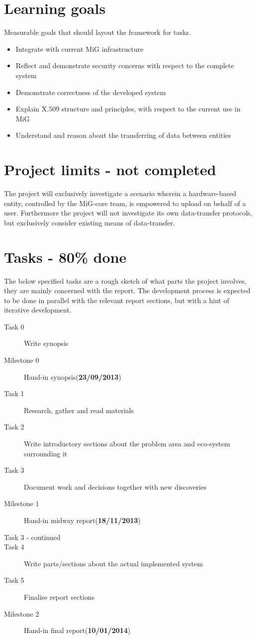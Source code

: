 \documentclass[paper=a4, fontsize=11pt]{scrartcl} %
\numberwithin{equation}{section} %
\numberwithin{figure}{section} %
\numberwithin{table}{section} %
\begin{document}
\section{Learning goals}
Measurable goals that should layout the framework for tasks.

\begin{itemize}
\item Integrate with current MiG infrastructure
\item Reflect and demonstrate security concerns with respect to the complete
    system
\item Demonstrate correctness of the developed system
\item Explain X.509 structure and principles, with respect to the current
    use in MiG
\item Understand and reason about the transferring of data between entities
\end{itemize}

\section{Project limits - not completed}
The project will exclusively investigate a scenario wherein a  hardware-based
entity, controlled by the MiG-core team, is empowered to upload on behalf of
a user. Furthermore the project will not investigate its own data-transfer
protocols, but exclusively consider existing means of data-transfer.

\section{Tasks - 80\% done}
The below specified tasks are a rough sketch of what parts the project
involves, they are mainly concerned with the report. The development process is
expected to be done in parallel with the relevant report sections, but with a
hint of iterative development.

\begin{description}
\item[Task 0] Write synopsis
\item[Milestone 0] Hand-in synopsis(\textbf{23/09/2013})
\item[Task 1] Research, gather and read materials
\item[Task 2] Write introductory sections about the problem area and eco-system
    surrounding it
\item[Task 3] Document work and decisions together with new discoveries
\item[Milestone 1] Hand-in midway report(\textbf{18/11/2013})
\item[Task 3 - continued]
\item[Task 4] Write parts/sections about the actual implemented system
\item[Task 5] Finalise report sections
\item[Milestone 2] Hand-in final report(\textbf{10/01/2014})
\end{description}
\end{document}
